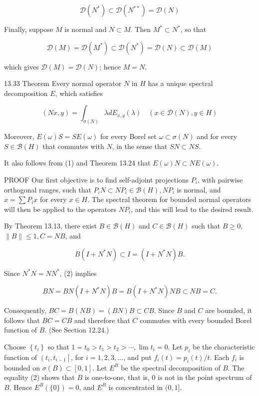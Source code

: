 \documentclass[10pt]{article}
\begin{document}
$$
\mathscr{D}\left(N^{*}\right) \subset \mathscr{D}\left(N^{* *}\right)=\mathscr{D}(N)
$$

Finally, suppose $M$ is normal and $N \subset M$. Then $M^{*} \subset N^{*}$, so that

$$
\mathscr{D}(M)=\mathscr{D}\left(M^{*}\right) \subset \mathscr{D}\left(N^{*}\right)=\mathscr{D}(N) \subset \mathscr{D}(M)
$$

which gives $\mathscr{D}(M)=\mathscr{D}(N)$; hence $M=N$.

13.33 Theorem Every normal operator $N$ in $H$ has a unique spectral decomposition $E$, which satisfies

$$
(N x, y)=\int_{\sigma(N)} \lambda d E_{x, y}(\lambda) \quad(x \in \mathscr{D}(N), y \in H)
$$

Moreover, $E(\omega) S=S E(\omega)$ for every Borel set $\omega \subset \sigma(N)$ and for every $S \in \mathscr{B}(H)$ that commutes with $N$, in the sense that $S N \subset N S$.

It also follows from (1) and Theorem 13.24 that $E(\omega) N \subset N E(\omega)$.

PROOF Our first objective is to find self-adjoint projections $P_{i}$, with pairwise orthogonal ranges, such that $P_{i} N \subset N P_{i} \in \mathscr{B}(H), N P_{i}$ is normal, and $x=\sum P_{i} x$ for every $x \in H$. The spectral theorem for bounded normal operators will then be applied to the operators $N P_{i}$, and this will lead to the desired result.

By Theorem 13.13, there exist $B \in \mathscr{\mathscr { B }}(H)$ and $C \in \mathscr{B}(H)$ such that $B \geq 0$, $\|B\| \leq 1, C=N B$, and

$$
B\left(I+N^{*} N\right) \subset I=\left(I+N^{*} N\right) B .
$$

Since $N^{*} N=N N^{*}$, (2) implies

$$
B N=B N\left(I+N^{*} N\right) B=B\left(I+N^{*} N\right) N B \subset N B=C .
$$

Consequently, $B C=B(N B)=(B N) B \subset C B$. Since $B$ and $C$ are bounded, it follows that $B C=C B$ and therefore that $C$ commutes with every bounded Borel function of $B$. (See Section 12.24.)

Choose $\left\{t_{i}\right\}$ so that $1=t_{0}>t_{1}>t_{2}>\cdots, \lim t_{i}=0$. Let $p_{i}$ be the
characteristic function of $\left(t_{i}, t_{i-1}\right]$, for $i=1,2,3, \ldots$, and put $f_{i}(t)=p_{i}(t) / t$. Each $f_{i}$ is bounded on $\sigma(B) \subset[0,1]$. Let $E^{B}$ be the spectral decomposition of $B$. The equality (2) shows that $B$ is one-to-one, that is, 0 is not in the point spectrum of $B$. Hence $E^{B}(\{0\})=0$, and $E^{B}$ is concentrated in $(0,1]$.
\end{document}
